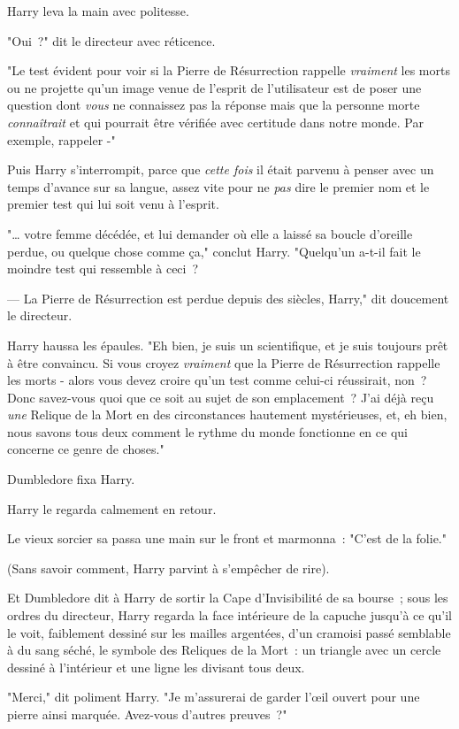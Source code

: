 Harry leva la main avec politesse.

"Oui~?" dit le directeur avec réticence.

"Le test évident pour voir si la Pierre de Résurrection rappelle \emph{vraiment} les morts ou ne projette qu'un image venue de l'esprit de l'utilisateur est de poser une question dont \emph{vous} ne connaissez pas la réponse mais que la personne morte \emph{connaîtrait} et qui pourrait être vérifiée avec certitude dans notre monde. Par exemple, rappeler -"

Puis Harry s'interrompit, parce que \emph{cette fois} il était parvenu à penser avec un temps d'avance sur sa langue, assez vite pour ne \emph{pas} dire le premier nom et le premier test qui lui soit venu à l'esprit.

"… votre femme décédée, et lui demander où elle a laissé sa boucle d'oreille perdue, ou quelque chose comme ça," conclut Harry. "Quelqu'un a-t-il fait le moindre test qui ressemble à ceci~?

--- La Pierre de Résurrection est perdue depuis des siècles, Harry," dit doucement le directeur.

Harry haussa les épaules. "Eh bien, je suis un scientifique, et je suis toujours prêt à être convaincu. Si vous croyez \emph{vraiment} que la Pierre de Résurrection rappelle les morts - alors vous devez croire qu'un test comme celui-ci réussirait, non~? Donc savez-vous quoi que ce soit au sujet de son emplacement~? J'ai déjà reçu \emph{une} Relique de la Mort en des circonstances hautement mystérieuses, et, eh bien, nous savons tous deux comment le rythme du monde fonctionne en ce qui concerne ce genre de choses."

Dumbledore fixa Harry.

Harry le regarda calmement en retour.

Le vieux sorcier sa passa une main sur le front et marmonna~: "C'est de la folie."

(Sans savoir comment, Harry parvint à s'empêcher de rire).

Et Dumbledore dit à Harry de sortir la Cape d'Invisibilité de sa bourse~; sous les ordres du directeur, Harry regarda la face intérieure de la capuche jusqu'à ce qu'il le voit, faiblement dessiné sur les mailles argentées, d'un cramoisi passé semblable à du sang séché, le symbole des Reliques de la Mort~: un triangle avec un cercle dessiné à l'intérieur et une ligne les divisant tous deux.

"Merci," dit poliment Harry. "Je m'assurerai de garder l'œil ouvert pour une pierre ainsi marquée. Avez-vous d'autres preuves~?"

